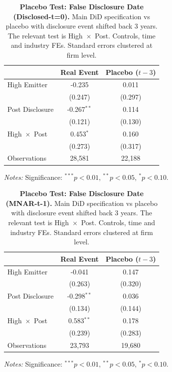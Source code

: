 \documentclass[a4paper,12pt]{article}
\begin{document}
\begin{table}[htbp]
\footnotesize\centering
\caption{\textbf{Placebo Test: False Disclosure Date (Disclosed-t=0).}
Main DiD specification vs placebo with disclosure event shifted back 3 years.
The relevant test is High~$\times$~Post.
Controls, time and industry FEs. Standard errors clustered at firm level.}
\label{tab:returns_placebo_disc}
\begin{tabular}{lcc}
\toprule
 & Real Event & Placebo ($t-3$) \\
\midrule
High Emitter & -0.235 & 0.011 \\
 & (0.247) & (0.297) \\

Post Disclosure & -0.267$^{**}$ & 0.114 \\
 & (0.121) & (0.130) \\

High~$\times$~Post & 0.453$^{*}$ & 0.160 \\
 & (0.273) & (0.317) \\

Observations & 28,581 & 22,188 \\
\bottomrule
\end{tabular}
\begin{flushleft}\footnotesize
\textit{Notes:} Significance: $^{***}p<0.01$, $^{**}p<0.05$, $^{*}p<0.10$.
\end{flushleft}
\end{table}


\begin{table}[htbp]
\footnotesize\centering
\caption{\textbf{Placebo Test: False Disclosure Date (MNAR-t-1).}
Main DiD specification vs placebo with disclosure event shifted back 3 years.
The relevant test is High~$\times$~Post.
Controls, time and industry FEs. Standard errors clustered at firm level.}
\label{tab:returns_placebo_mnar}
\begin{tabular}{lcc}
\toprule
 & Real Event & Placebo ($t-3$) \\
\midrule
High Emitter & -0.041 & 0.147 \\
 & (0.263) & (0.320) \\

Post Disclosure & -0.298$^{**}$ & 0.036 \\
 & (0.134) & (0.144) \\

High~$\times$~Post & 0.583$^{**}$ & 0.178 \\
 & (0.239) & (0.283) \\

Observations & 23,793 & 19,680 \\
\bottomrule
\end{tabular}
\begin{flushleft}\footnotesize
\textit{Notes:} Significance: $^{***}p<0.01$, $^{**}p<0.05$, $^{*}p<0.10$.
\end{flushleft}
\end{table}
\end{document}
